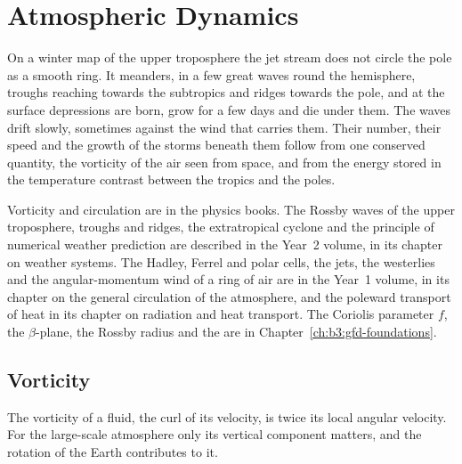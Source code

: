 \chapter{Atmospheric Dynamics}\label{ch:b3:atmospheric-dynamics}

On a winter map of the upper troposphere the jet stream does not circle the
pole as a smooth ring. It meanders, in a few great waves round the
hemisphere, troughs reaching towards the subtropics and ridges towards the
pole, and at the surface depressions are born, grow for a few days and die
under them. The waves drift slowly, sometimes against the wind that carries
them. Their number, their speed and the growth of the storms beneath them
follow from one conserved quantity, the vorticity of the air seen from
space, and from the energy stored in the temperature contrast between the
tropics and the poles.

\begin{recall}
Vorticity and circulation are in the physics books. The Rossby waves of the
upper troposphere, troughs and ridges, the extratropical cyclone and the
principle of numerical weather prediction are described in the Year~2
volume, in its chapter on weather systems. The Hadley, Ferrel and polar
cells, the jets, the westerlies and the angular-momentum wind of a ring of
air are in the Year~1 volume, in its chapter on the general circulation of
the atmosphere, and the poleward transport of heat in its chapter on
radiation and heat transport. The Coriolis parameter $f$, the $\beta$-plane,
the Rossby radius and the  are in
Chapter~\ref{ch:b3:gfd-foundations}.
\end{recall}

\section{Vorticity}\label{sec:b3:atmospheric-dynamics:vorticity}

The vorticity of a fluid, the curl of its velocity, is twice its local
angular velocity. For the large-scale atmosphere only its vertical
component matters, and the rotation of the Earth contributes to it.

